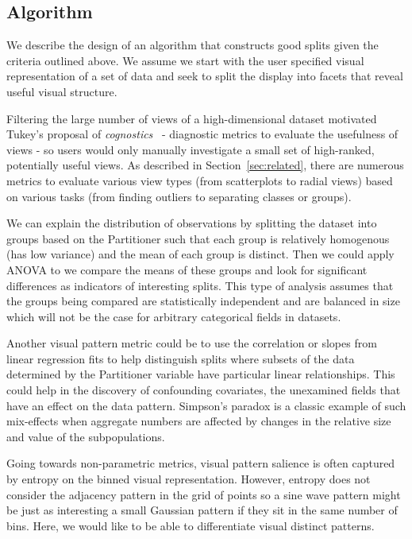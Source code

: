 \subsection{Algorithm}
We describe the design of an algorithm that constructs good splits given the criteria outlined above. We assume we start with the user specified visual representation of a set of data and seek to split the display into facets that reveal useful visual structure.

Filtering the large number of views of a high-dimensional dataset motivated Tukey's proposal of \textit{cognostics}~\cite{Tukey1982,Tukey1985} - diagnostic metrics to evaluate the usefulness of views - so users would only manually investigate a small set of high-ranked, potentially useful views. As described in Section~\ref{sec:related}, there are numerous metrics to evaluate various view types (from scatterplots to radial views) based on various tasks (from finding outliers to separating classes or groups).

We can explain the distribution of observations by splitting the dataset into groups based on the Partitioner such that each group is relatively homogenous (has low variance) and the mean of each group is distinct. Then we could apply ANOVA to we compare the means of these groups and look for significant differences as indicators of interesting splits. This type of analysis assumes that the groups being compared are statistically independent and are balanced in size which will not be the case for arbitrary categorical fields in datasets. 

Another visual pattern metric could be to use the correlation or slopes from linear regression fits to help distinguish splits where subsets of the data determined by the Partitioner variable have particular linear relationships. This could help in the discovery of confounding covariates, the unexamined fields that have an effect on the data pattern. Simpson's paradox is a classic example of such mix-effects when aggregate numbers are affected by changes in the relative size and value of the subpopulations. 

Going towards non-parametric metrics, visual pattern salience is often captured by entropy on the binned visual representation. However, entropy does not consider the adjacency pattern in the grid of points so a sine wave pattern might be just as interesting a small Gaussian pattern if they sit in the same number of bins. Here, we would like to be able to differentiate visual distinct patterns.

